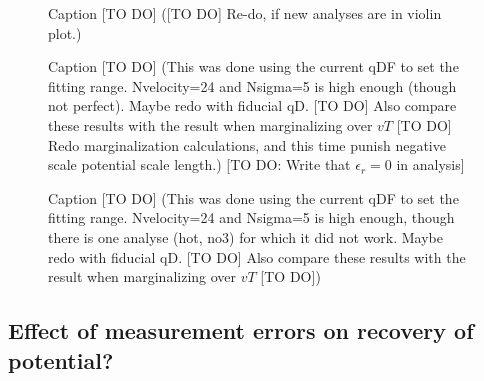 \documentclass[12pt,preprint]{aastex}
\begin{document}


\begin{figure}
\caption{Caption [TO DO] ([TO DO] Re-do, if new analyses are in violin plot.)} 
\label{fig:incomp_mockdata}
\end{figure}


\begin{figure}
\caption{Caption [TO DO] (This was done using the current qDF to set the fitting range. Nvelocity=24 and Nsigma=5 is high enough (though not perfect). Maybe redo with fiducial qD. [TO DO] Also compare these results with the result when marginalizing over $vT$ [TO DO] Redo marginalization calculations, and this time punish negative scale potential scale length.) [TO DO: Write that $\epsilon_r = 0$ in analysis]} 
\label{fig:isoSphFlexIncompR_violins}
\end{figure}




\begin{figure}
\caption{Caption [TO DO] (This was done using the current qDF to set the fitting range. Nvelocity=24 and Nsigma=5 is high enough, though there is one analyse (hot, no3) for which it did not work. Maybe redo with fiducial qD. [TO DO] Also compare these results with the result when marginalizing over $vT$ [TO DO])} 
\label{fig:isoSphFlexIncompZ_violins}
\end{figure}





\subsection{Effect of measurement errors on recovery of potential?}
\end{document}
